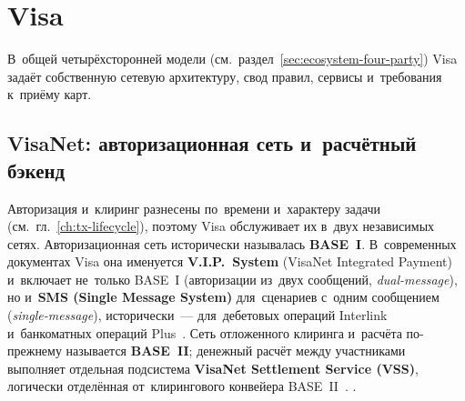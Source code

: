 
\chapter{Visa}\label{ch:visa}
В~общей четырёхсторонней модели
(см.~раздел~\ref{sec:ecosystem-four-party}) Visa задаёт собственную сетевую
архитектуру, свод правил, сервисы и~требования к~приёму карт.


\section{VisaNet: авторизационная сеть и~расчётный бэкенд}\label{sec:visa-visanet}

Авторизация и~клиринг разнесены по~времени и~характеру задачи
(см.~гл.~\ref{ch:tx-lifecycle}), поэтому Visa обслуживает их в~двух
независимых сетях.
Авторизационная сеть исторически называлась \textbf{BASE~I}. В~современных
документах Visa она именуется \textbf{V.I.P.~System} (VisaNet Integrated Payment)
и~включает не~только BASE~I (авторизации из~двух сообщений,
\textit{dual-message}), но и~\textbf{SMS (Single Message System)} для~сценариев
с~одним сообщением (\textit{single-message}), исторически~--- для~дебетовых операций Interlink
и~банкоматных операций Plus~\cite{visa-vip-system-overview-2005}. Сеть
отложенного клиринга и~расчёта по-прежнему называется \textbf{BASE~II};
денежный расчёт между участниками выполняет отдельная подсистема
\textbf{VisaNet Settlement Service (VSS)}, логически отделённая от~клирингового
конвейера BASE~II~\cite{visa-core-rules,visa-vip-system-overview-2005}.
.

